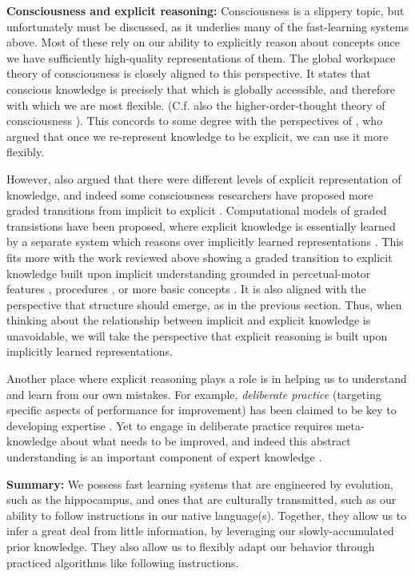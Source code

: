 \textbf{Consciousness and explicit reasoning:} Consciousness is a slippery topic, but unfortunately must be discussed, as it underlies many of the fast-learning systems above. Most of these rely on our ability to explicitly reason about concepts once we have sufficiently high-quality representations of them. The global workspace theory of consciousness \citep{Baars2005, Dehaene2017} is closely aligned  to this perspective. It states that conscious knowledge is precisely that which is globally accessible, and therefore with which we are most flexible. (C.f. also the higher-order-thought theory of consciousness \citep{Rosenthal1990}). This concords to some degree with the perspectives of \citet{Karmiloff-Smith1986}, who argued that once we re-represent knowledge to be explicit, we can use it more flexibly. \par
However, \citet{Karmiloff-Smith1986} also argued that there were different levels of explicit representation of knowledge, and indeed some consciousness researchers have proposed more graded transitions from implicit to explicit \citep[e.g.][]{Cleeremans2002}. Computational models of graded transistions have been proposed, where explicit knowledge is essentially learned by a separate system which reasons over implicitly learned representations \citep{Cleeremans2014}. This fits more with the work reviewed above showing a graded transition to explicit knowledge built upon implicit understanding grounded in percetual-motor features \citep[e.g.][]{Goldin-Meadow1993}, procedures \citep[e.g.][]{Hazzan1999}, or more basic concepts \citep{Wilensky1991, Patel2018}. It is also aligned with the perspective that structure should emerge, as in the previous section. Thus, when thinking about the relationship between implicit and explicit knowledge is unavoidable, we will take the perspective that explicit reasoning is built upon implicitly learned representations. \par 
Another place where explicit reasoning plays a role is in helping us to understand and learn from our own mistakes. For example, \emph{deliberate practice} (targeting specific aspects of performance for improvement) has been claimed to be key to developing expertise \citep{Ericsson1993, Ericsson2017}. Yet to engage in deliberate practice requires meta-knowledge about what needs to be improved, and indeed this abstract understanding is an important component of expert knowledge \citep{Feltovich2012}. \par
\textbf{Summary:} We possess fast learning systems that are engineered by evolution, such as the hippocampus, and ones that are culturally transmitted, such as our ability to follow instructions in our native language(s). Together, they allow us to infer a great deal from little information, by leveraging our slowly-accumulated prior knowledge. They also allow us to flexibly adapt our behavior through practiced algorithms like following instructions. \par 

